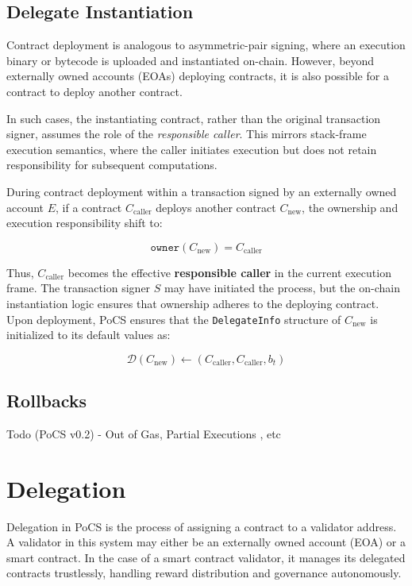 \documentclass{article}
\begin{document}
\subsection{Delegate Instantiation}

Contract deployment is analogous to asymmetric-pair signing, where an execution binary or bytecode is uploaded and instantiated on-chain. However, beyond externally owned accounts (EOAs) deploying contracts, it is also possible for a contract to deploy another contract.  

In such cases, the instantiating contract, rather than the original transaction signer, assumes the role of the \textit{responsible caller}. This mirrors stack-frame execution semantics, where the caller initiates execution but does not retain responsibility for subsequent computations.
 
During contract deployment within a transaction signed by an externally owned account \( E \), if a contract \( C_{\text{caller}} \) deploys another contract \( C_{\text{new}} \), the ownership and execution responsibility shift to:

\begin{equation}
    \texttt{owner}(C_{\text{new}}) = C_{\text{caller}}
\end{equation}

Thus, \( C_{\text{caller}} \) becomes the effective \textbf{responsible caller} in the current execution frame. The transaction signer \( S \) may have initiated the process, but the on-chain instantiation logic ensures that ownership adheres to the deploying contract.
Upon deployment, PoCS ensures that the \texttt{DelegateInfo} structure of \( C_{\text{new}} \) is initialized to its default values as:

\begin{equation}
    \mathcal{D}(C_{\text{new}}) \gets (C_{\text{caller}}, C_{\text{caller}}, b_t)
\end{equation}

\subsection{Rollbacks}

Todo (PoCS v0.2) - Out of Gas, Partial Executions , etc

\section{Delegation}

Delegation in PoCS is the process of assigning a contract to a validator address. A validator in this system may either be an externally owned account (EOA) or a smart contract. In the case of a smart contract validator, it manages its delegated contracts trustlessly, handling reward distribution and governance autonomously.
\end{document}
